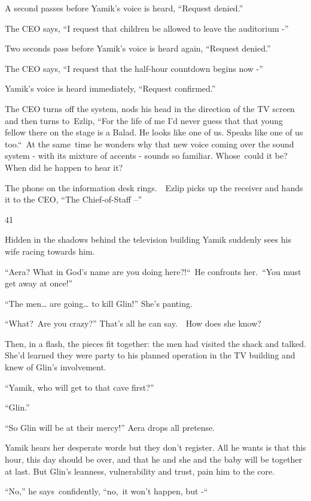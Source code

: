 \documentclass[twoside,11pt]{book}
\begin{document}
A second passes before Yamik's voice is heard, ``Request denied.''

The CEO says, ``I request that children be allowed to leave the auditorium -''

Two seconds pass before Yamik's voice is heard again, ``Request denied.''

The CEO says, ``I request that the half{}-hour countdown begins now -''

Yamik's voice is heard immediately, ``Request confirmed.''

The CEO turns off the system, nods his head in the direction of the TV screen and then turns
to{\ }Ezlip, ``For the life of me I'd never guess that that young
fellow there on the stage is a Balad. He looks like one of us. Speaks like one of us too.``\ At the
same\ time he wonders why that new voice coming over the sound system - with its mixture of accents - sounds so
familiar. Whose{\ }could it be? When did he happen to hear it?

The phone on the information desk rings.\ \ Ezlip picks up the receiver and hands it to the CEO, ``The
Chief-of-Staff --''


\bigskip

41\ 

Hidden in the shadows behind the television building Yamik suddenly sees his wife racing towards him. 

{}``Aera? What in God's name are you doing here?!``\ He confronts her.\ ``You must get away at
once!''\ 

``The men{\dots} are going{\dots} to kill Glin!'' She{}'s panting.

``What?{\ }Are you crazy?'' That's all he can
say.\ \ How does she know? 

Then, in a flash, the pieces fit together: the men had visited the shack and talked. She'd learned they were party to
his planned operation in the TV building and knew of Glin's involvement.

``Yamik, who will get to that cave first?'' 

``Glin.'' 

``So Glin will be at their mercy!'' Aera drops all pretense. 

Yamik hears her desperate words but they don't register. All he wants is that this hour, this day should be over, and
that he and she and the baby will be together at last. But Glin's leanness, vulnerability and trust, pain him to the
core{.}

 ``No,'' he says{\ }confidently,
``no,{\ }it won't happen, but -``\ 
\end{document}
